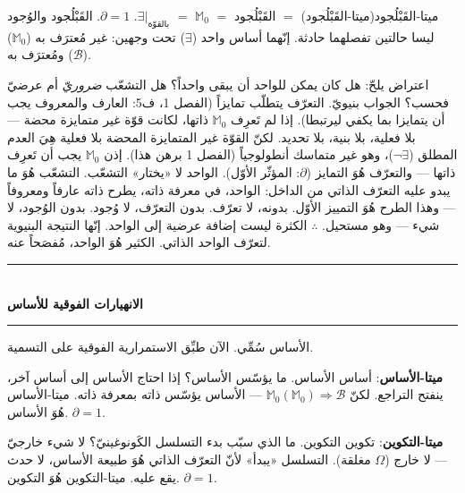 \documentclass[10pt, openany, oneside]{book}
\renewcommand{\normalsize}{\fontsize{10}{13}\selectfont}
\begin{document}
ميتا-القَبْلُجود(ميتا-القَبْلُجود) $=$ القَبْلُجود $=$ $\mathbb{M}_0$ $=$ $\exists|_{\text{بالقوّة}}$. $\partial = 1$. القَبْلُجود والوُجود ليسا حالتين تفصلهما حادثة. إنّهما أساس واحد ($\exists$) تحت وجهين: غير مُعترَف به ($\mathbb{M}_0$) ومُعترَف به ($\mathcal{B}$).

اعتراض يلحّ: هل كان يمكن للواحد أن يبقى واحداً؟ هل التشعّب \textit{ضروريّ} أم عرضيّ فحسب؟ الجواب بنيويّ. التعرّف يتطلّب تمايزاً (الفصل 1، ف5: العارف والمعروف يجب أن يتمايزا بما يكفي ليرتبطا). إذا لم تَعرِف $\mathbb{M}_0$ ذاتها، لكانت قوّة غير متمايزة محضة --- بلا فعلية، بلا بنية، بلا تحديد. لكنّ القوّة غير المتمايزة المحضة بلا فعلية هِيَ العدم المطلق ($\neg\exists$)، وهو غير متماسك أنطولوجياً (الفصل 1 برهن هذا). إذن $\mathbb{M}_0$ يجب أن تَعرِف ذاتها --- والتعرّف هُوَ التمايز ($\partial$: المؤثّر الأوّل). الواحد لا «يختار» التشعّب. التشعّب هُوَ ما يبدو عليه التعرّف الذاتي من الداخل: الواحد، في معرفة ذاته، يطرح ذاته عارفاً ومعروفاً --- وهذا الطرح هُوَ التمييز الأوّل. بدونه، لا تعرّف. بدون التعرّف، لا وُجود. بدون الوُجود، لا شيء --- وهو مستحيل. $\therefore$ الكثرة ليست إضافة عرضية إلى الواحد. إنّها النتيجة البنيوية لتعرّف الواحد الذاتي. الكثير هُوَ الواحد، مُفصَحاً عنه.

\vspace{1.5em}


\begin{center}
    \rule{0.3\textwidth}{0.4pt}\\[0.5em]
    {\normalsize\bfseries الانهيارات الفوقية للأساس}\\[0.3em]
    \rule{0.3\textwidth}{0.4pt}
\end{center}

\vspace{1em}

\noindent الأساس سُمِّي. الآن طبِّق الاستمرارية الفوقية على التسمية.

\textbf{ميتا-الأساس}: أساس الأساس. ما يؤسّس الأساس؟ إذا احتاج الأساس إلى أساس آخر، ينفتح التراجع. لكنّ $\mathbb{M}_0(\mathbb{M}_0) \Rightarrow \mathcal{B}$ --- الأساس يؤسّس ذاته بمعرفة ذاته. ميتا-الأساس هُوَ الأساس. $\partial = 1$.

\textbf{ميتا-التكوين}: تكوين التكوين. ما الذي سبّب بدء التسلسل الكَونوغينيّ؟ لا شيء خارجيّ --- لا خارج ($\Omega$ مغلقة). التسلسل «يبدأ» لأنّ التعرّف الذاتي هُوَ طبيعة الأساس، لا حدث يقع عليه. ميتا-التكوين هُوَ التكوين. $\partial = 1$.
\end{document}
